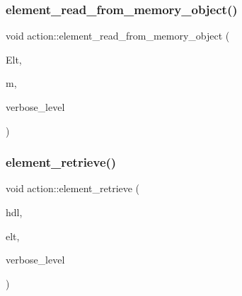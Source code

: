 \mbox{\label{classaction_a546c94eb9c6a9fdaceb966312b81c039}} 
\subsubsection{\texorpdfstring{element\+\_\+read\+\_\+from\+\_\+memory\+\_\+object()}{element\_read\_from\_memory\_object()}}
{\footnotesize\ttfamily void action\+::element\+\_\+read\+\_\+from\+\_\+memory\+\_\+object (\begin{DoxyParamCaption}\item[{\mbox{\hyperlink{galois_8h_a09fddde158a3a20bd2dcadb609de11dc}{I\+NT}} $\ast$}]{Elt,  }\item[{\mbox{\hyperlink{classmemory__object}{memory\+\_\+object}} $\ast$}]{m,  }\item[{\mbox{\hyperlink{galois_8h_a09fddde158a3a20bd2dcadb609de11dc}{I\+NT}}}]{verbose\+\_\+level }\end{DoxyParamCaption})}

\mbox{\label{classaction_ad28f6f8810ffbad64c1490f78e51e2b1}} 
\subsubsection{\texorpdfstring{element\+\_\+retrieve()}{element\_retrieve()}}
{\footnotesize\ttfamily void action\+::element\+\_\+retrieve (\begin{DoxyParamCaption}\item[{\mbox{\hyperlink{galois_8h_a09fddde158a3a20bd2dcadb609de11dc}{I\+NT}}}]{hdl,  }\item[{void $\ast$}]{elt,  }\item[{\mbox{\hyperlink{galois_8h_a09fddde158a3a20bd2dcadb609de11dc}{I\+NT}}}]{verbose\+\_\+level }\end{DoxyParamCaption})}

\mbox{\label{classaction_a9b35c055328c84be97c300fb0758f31b}} 
